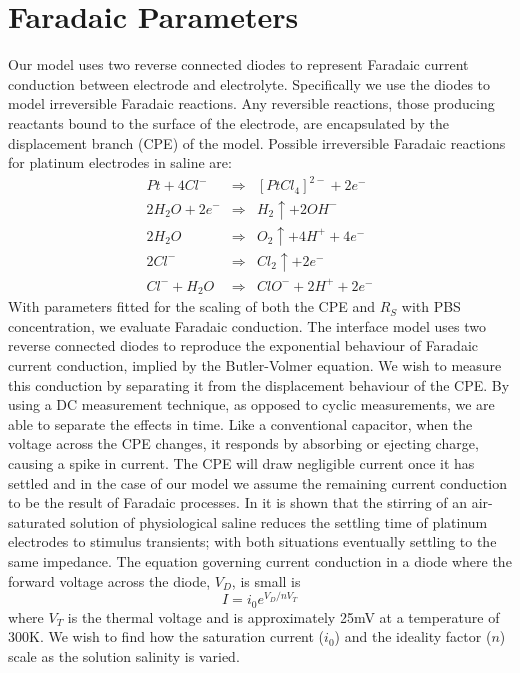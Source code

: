 \documentclass[journal, a4paper]{IEEEtran}
\begin{document}
{\section{Faradaic Parameters}
{
    \color{blue}
    Our model uses two reverse connected diodes to represent Faradaic current conduction between electrode and electrolyte. Specifically we use the diodes to model irreversible Faradaic reactions. Any reversible reactions, those producing reactants bound to the surface of the electrode, are encapsulated by the displacement branch (CPE) of the model.
    Possible irreversible Faradaic reactions for platinum electrodes in saline are:
    \begin{eqnarray}
        Pt + 4Cl^{-} &\Rightarrow& [PtCl_{4}]^{2-} + 2 e^{-}\\
        2H_{2}O + 2 e^{-} &\Rightarrow& H_{2}\uparrow + 2OH^{-}\\
        2H_{2}O &\Rightarrow& O_{2}\uparrow + 4H^{+} + 4e^{-}\\
        2Cl^{-} &\Rightarrow& Cl_{2}\uparrow + 2e^{-}\\
        Cl^{-} + H_{2}O &\Rightarrow& ClO^{-} + 2H^{+} + 2e^{-}
    \end{eqnarray} 
}
With parameters fitted for the scaling of both the CPE and $R_{S}$ with PBS concentration, we evaluate Faradaic conduction. The interface model uses two reverse connected diodes to reproduce the exponential behaviour of Faradaic current conduction, implied by the Butler-Volmer equation. We wish to measure this conduction by separating it from the displacement behaviour of the CPE. By using a DC measurement technique, as opposed to cyclic measurements, we are able to separate the effects in time. 
Like a conventional capacitor, when the voltage across the CPE changes, it responds by absorbing or ejecting charge, causing a spike in current. The CPE will draw negligible current once it has settled and in the case of our model we assume the remaining current conduction to be the result of Faradaic processes. 
{\color{blue} In \cite{Greatbatch1969} it is shown that the stirring of an air-saturated solution of physiological saline reduces the settling time of platinum electrodes to stimulus transients; with both situations eventually settling to the same impedance.}
The equation governing current conduction in a diode where the forward voltage across the diode, $V_{D}$, is small is
\begin{equation}
    I = i_{0}  e^{V_{D} / n V_{T}}
\end{equation}
where $V_{T}$ is the thermal voltage and is approximately 25\thinspace mV at a temperature of 300\thinspace K. We wish to find how the saturation current ($i_{0}$) and the ideality factor ($n$) scale as the solution salinity is varied.

}
\end{document}
